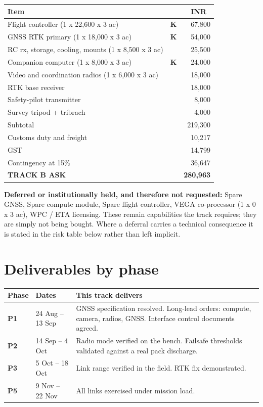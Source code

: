 \documentclass[11pt,a4paper]{article}
\newcommand{\inr}[1]{INR~#1}
\begin{document}
\begin{center}
\begin{tabular}{@{}p{88mm}cr@{}}
\toprule
\textbf{Item} & & \textbf{\inr{}} \\
\midrule
Flight controller (1 x 22,600 x 3 ac) & \textbf{K} & 67,800 \\
GNSS RTK primary (1 x 18,000 x 3 ac) & \textbf{K} & 54,000 \\
RC rx, storage, cooling, mounts (1 x 8,500 x 3 ac) &  & 25,500 \\
Companion computer (1 x 8,000 x 3 ac) & \textbf{K} & 24,000 \\
Video and coordination radios (1 x 6,000 x 3 ac) &  & 18,000 \\
RTK base receiver &  & 18,000 \\
Safety-pilot transmitter &  & 8,000 \\
Survey tripod + tribrach &  & 4,000 \\
\midrule
Subtotal & & 219,300 \\
Customs duty and freight & & 10,217 \\
GST & & 14,799 \\
Contingency at 15\% & & 36,647 \\
\midrule
\textbf{TRACK B ASK} & & \textbf{280,963} \\
\bottomrule
\end{tabular}
\end{center}


\textbf{Deferred or institutionally held, and therefore not requested:}
Spare GNSS, Spare compute module, Spare flight controller, VEGA co-processor (1 x 0 x 3 ac), WPC / ETA licensing. These remain capabilities the track requires; they are simply not being
bought. Where a deferral carries a technical consequence it is stated in the
risk table below rather than left implicit.

\section{Deliverables by phase}

\begin{center}
\begin{tabular}{@{}llp{88mm}@{}}
\toprule
\textbf{Phase} & \textbf{Dates} & \textbf{This track delivers} \\
\midrule
\textbf{P1} & 24 Aug -- 13 Sep & GNSS specification resolved. Long-lead orders: compute, camera, radios, GNSS. Interface control documents agreed. \\
\textbf{P2} & 14 Sep -- 4 Oct & Radio mode verified on the bench. Failsafe thresholds validated against a real pack discharge. \\
\textbf{P3} & 5 Oct -- 18 Oct & Link range verified in the field. RTK fix demonstrated. \\
\textbf{P5} & 9 Nov -- 22 Nov & All links exercised under mission load. \\
\bottomrule
\end{tabular}
\end{center}
\end{document}
